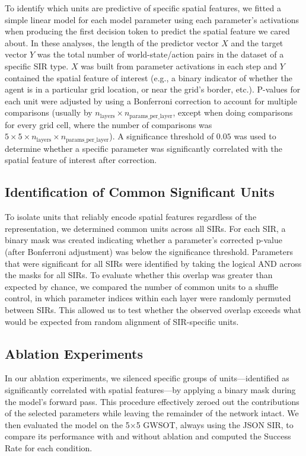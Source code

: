 \documentclass[runningheads]{llncs}
\begin{document}
To identify which units are predictive of specific spatial features, we fitted a simple linear model for each model parameter using each parameter’s activations when producing the first decision token to predict the spatial feature we cared about. In these analyses, the length of the predictor vector $X$ and the target vector $Y$ was the total number of world-state/action pairs in the dataset of a specific SIR type. $X$ was built from parameter activations in each step and $Y$ contained the spatial feature of interest (e.g., a binary indicator of whether the agent is in a particular grid location, or near the grid’s border, etc.). P-values for each unit were adjusted by using a Bonferroni correction to account for multiple comparisons (usually by $n_{\text{layers}} \times n_{\text{params\_per\_layer}}$, except when doing comparisons for every grid cell, where the number of comparisons was $5 \times 5 \times n_{\text{layers}} \times n_{\text{params\_per\_layer}}$). A significance threshold of $0.05$ was used to determine whether a specific parameter was significantly correlated with the spatial feature of interest after correction.

\subsection{Identification of Common Significant Units}

To isolate units that reliably encode spatial features regardless of the representation, we determined common units across all SIRs. For each SIR, a binary mask was created indicating whether a parameter’s corrected p-value (after Bonferroni adjustment) was below the significance threshold. Parameters that were significant for all SIRs were identified by taking the logical AND across the masks for all SIRs. To evaluate whether this overlap was greater than expected by chance, we compared the number of common units to a shuffle control, in which parameter indices within each layer were randomly permuted between SIRs. This allowed us to test whether the observed overlap exceeds what would be expected from random alignment of SIR-specific units.

\subsection{Ablation Experiments}

In our ablation experiments, we silenced specific groups of units—identified as significantly correlated with spatial features—by applying a binary mask during the model’s forward pass. This procedure effectively zeroed out the contributions of the selected parameters while leaving the remainder of the network intact. We then evaluated the model on the 5×5 GWSOT, always using the JSON SIR, to compare its performance with and without ablation and computed the Success Rate for each condition.
\end{document}

